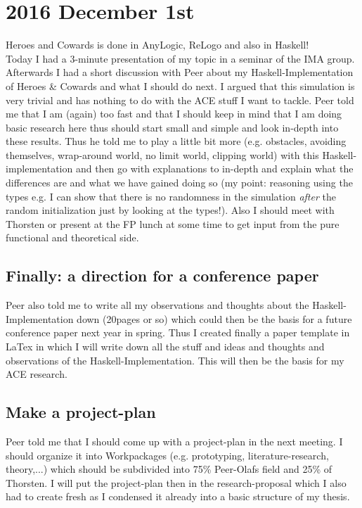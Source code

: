 \section*{2016 December 1st}
Heroes and Cowards is done in AnyLogic, ReLogo and also in Haskell! \\
Today I had a 3-minute presentation of my topic in a seminar of the IMA group. Afterwards I had a short discussion with Peer about my Haskell-Implementation of Heroes \& Cowards and what I should do next. I argued that this simulation is very trivial and has nothing to do with the ACE stuff I want to tackle. Peer told me that I am (again) too fast and that I should keep in mind that I am doing basic research here thus should start small and simple and look in-depth into these results. Thus he told me to play a little bit more (e.g. obstacles, avoiding themselves, wrap-around world, no limit world, clipping world) with this Haskell-implementation and then go with explanations to in-depth and explain what the differences are and what we have gained doing so (my point: reasoning using the types e.g. I can show that there is no randomness in the simulation \textit{after} the random initialization just by looking at the types!). Also I should meet with Thorsten or present at the FP lunch at some time to get input from the pure functional and theoretical side.

\subsection*{Finally: a direction for a conference paper}
Peer also told me to write all my observations and thoughts about the Haskell-Implementation down (20pages or so) which could then be the basis for a future conference paper next year in spring. Thus I created finally a paper template in LaTex in which I will write down all the stuff and ideas and thoughts and observations of the Haskell-Implementation. This will then be the basis for my ACE research.

\subsection*{Make a project-plan}
Peer told me that I should come up with a project-plan in the next meeting. I should organize it into Workpackages (e.g. prototyping, literature-research, theory,...) which should be subdivided into 75\% Peer-Olafs field and 25\% of Thorsten. I will put the project-plan then in the research-proposal which I also had to create fresh as I condensed it already into a basic structure of my thesis.

